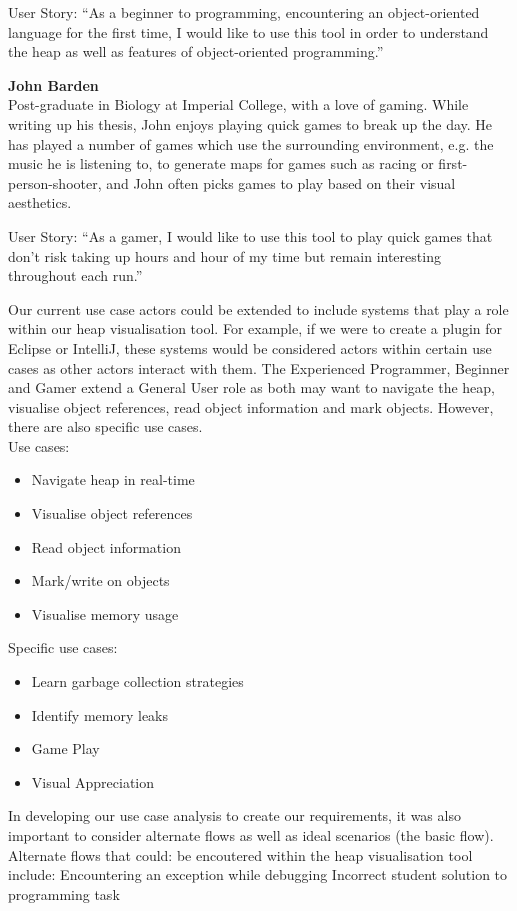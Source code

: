 \documentclass[10pt, a4paper]{article}
\begin{document}
User Story: “As a beginner to programming, encountering an object-oriented language for the first time, I would like to use this tool in order to understand the heap as well as features of object-oriented programming.”

\textbf{John Barden}
\\ Post-graduate in Biology at Imperial College, with a love of gaming. While writing up his thesis, John enjoys playing quick games to break up the day. He has played a number of games which use the surrounding environment, e.g. the music he is listening to, to generate maps for games such as racing or first-person-shooter, and John often picks games to play based on their visual aesthetics.

User Story: “As a gamer, I would like to use this tool to play quick games that don’t risk taking up hours and hour of my time but remain interesting throughout each run.”

Our current use case actors could be extended to include systems that play a role within our heap visualisation tool. For example, if we were to create a plugin for Eclipse or IntelliJ, these systems would be considered actors within certain use cases as other actors interact with them. The Experienced Programmer, Beginner and Gamer extend a General User role as both may want to navigate the heap, visualise object references, read object information and mark objects. However, there are also specific use cases.
\\

\noindent Use cases:
\begin{itemize}

  \item Navigate heap in real-time
  \item Visualise object references
  \item Read object information
  \item Mark/write on objects 
  \item Visualise memory usage

\end{itemize}

\noindent Specific use cases:
\begin{itemize}

  \item Learn garbage collection strategies
  \item Identify memory leaks
  \item Game Play
  \item Visual Appreciation

\end{itemize}
In developing our use case analysis to create our requirements, it was also important to consider alternate flows as well as ideal scenarios (the basic flow). Alternate flows that could: be encoutered within the heap visualisation tool include:
Encountering an exception while debugging
Incorrect student solution to programming task
\end{document}
